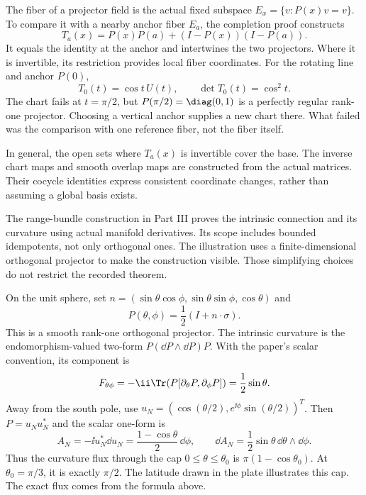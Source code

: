 The fiber of a projector field is the actual fixed subspace $E_x=\{v:P(x)v=v\}$. To compare it with a nearby anchor fiber $E_a$, the completion proof constructs
\[
T_a(x)=P(x)P(a)+(I-P(x))(I-P(a)).
\]
It equals the identity at the anchor and intertwines the two projectors. Where it is invertible, its restriction provides local fiber coordinates.
For the rotating line and anchor $P(0)$,
\[
T_0(t)=\cos t\,U(t),\qquad \det T_0(t)=\cos^2t.
\]
The chart fails at $t=\pi/2$, but $P(\pi/2)=\diag(0,1)$ is a perfectly regular rank-one projector. Choosing a vertical anchor supplies a new chart there. What failed was the comparison with one reference fiber, not the fiber itself.

In general, the open sets where $T_a(x)$ is invertible cover the base. The inverse chart maps and smooth overlap maps are constructed from the actual matrices. Their cocycle identities express consistent coordinate changes, rather than assuming a global basis exists.

The range-bundle construction in Part III proves the intrinsic connection and its curvature using actual manifold derivatives. Its scope includes bounded idempotents, not only orthogonal ones. The illustration uses a finite-dimensional orthogonal projector to make the construction visible. Those simplifying choices do not restrict the recorded theorem.

On the unit sphere, set $n=(\sin\theta\cos\phi,\sin\theta\sin\phi,\cos\theta)$ and
\[
P(\theta,\phi)=\frac12(I+n\cdot\sigma).
\]
This is a smooth rank-one orthogonal projector. The intrinsic curvature is the endomorphism-valued two-form $P(\dd P\wedge\dd P)P$. With the paper's scalar convention, its component is
\[
F_{\theta\phi}=-\ii\Tr\!\left(P[\partial_\theta P,\partial_\phi P]\right)
=\frac12\sin\theta.
\]
Away from the south pole, use $u_N=(\cos(\theta/2),e^{\ii\phi}\sin(\theta/2))^T$. Then $P=u_Nu_N^*$ and the scalar one-form is
\[
A_N=-\ii u_N^*\dd u_N=\frac{1-\cos\theta}{2}\,\dd\phi,
\qquad \dd A_N=\frac12\sin\theta\,\dd\theta\wedge\dd\phi.
\]
Thus the curvature flux through the cap $0\le\theta\le\theta_0$ is $\pi(1-\cos\theta_0)$. At $\theta_0=\pi/3$, it is exactly $\pi/2$. The latitude drawn in the plate illustrates this cap. The exact flux comes from the formula above.

